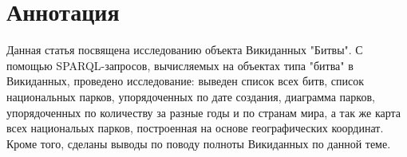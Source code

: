 \section{Аннотация}

Данная статья посвящена исследованию объекта Викиданных "Битвы". С помощью SPARQL-запросов, вычисляемых на объектах типа "битва" в Викиданных, проведено исследование: выведен список всех битв, список национальных парков, упорядоченных по дате создания, диаграмма парков, упорядоченных по количеству за разные годы и по странам мира, а так же карта всех национальых парков, построенная на основе географических координат. Кроме того, сделаны выводы по поводу полноты Викиданных по данной теме.